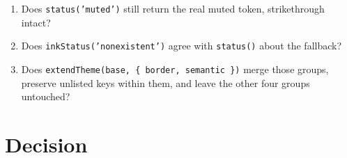 \begin{enumerate}
\item
  Does \texttt{s\allowbreak{}t\allowbreak{}a\allowbreak{}t\allowbreak{}u\allowbreak{}s\allowbreak{}(\allowbreak{}'\allowbreak{}m\allowbreak{}u\allowbreak{}t\allowbreak{}e\allowbreak{}d\allowbreak{}'\allowbreak{})} still return the real muted token, strikethrough intact?
\item
  Does \texttt{i\allowbreak{}n\allowbreak{}k\allowbreak{}S\allowbreak{}t\allowbreak{}a\allowbreak{}t\allowbreak{}u\allowbreak{}s\allowbreak{}(\allowbreak{}'\allowbreak{}n\allowbreak{}o\allowbreak{}n\allowbreak{}e\allowbreak{}x\allowbreak{}i\allowbreak{}s\allowbreak{}t\allowbreak{}e\allowbreak{}n\allowbreak{}t\allowbreak{}'\allowbreak{})} agree with \texttt{s\allowbreak{}t\allowbreak{}a\allowbreak{}t\allowbreak{}u\allowbreak{}s\allowbreak{}(\allowbreak{})} about the fallback?
\item
  Does \texttt{e\allowbreak{}x\allowbreak{}t\allowbreak{}e\allowbreak{}n\allowbreak{}d\allowbreak{}T\allowbreak{}h\allowbreak{}e\allowbreak{}m\allowbreak{}e\allowbreak{}(\allowbreak{}b\allowbreak{}a\allowbreak{}s\allowbreak{}e\allowbreak{},\allowbreak{} \allowbreak{}\{\allowbreak{} \allowbreak{}b\allowbreak{}o\allowbreak{}r\allowbreak{}d\allowbreak{}e\allowbreak{}r\allowbreak{},\allowbreak{} \allowbreak{}s\allowbreak{}e\allowbreak{}m\allowbreak{}a\allowbreak{}n\allowbreak{}t\allowbreak{}i\allowbreak{}c\allowbreak{} \allowbreak{}\}\allowbreak{})} merge those groups, preserve unlisted keys within them, and leave the other four groups untouched?
\end{enumerate}

\section{Decision}\label{record-147-decision}

